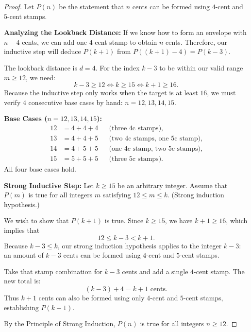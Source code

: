 \begin{proof}
Let $P(n)$ be the statement that $n$ cents can be formed using $4$-cent and $5$-cent stamps.

\textbf{Analyzing the Lookback Distance:}
If we know how to form an envelope with $n - 4$ cents, we can add one $4$-cent stamp to obtain $n$ cents. Therefore, our inductive step will deduce $P(k+1)$ from $P((k+1) - 4) = P(k-3)$.

The lookback distance is $d = 4$. For the index $k-3$ to be within our valid range $m \ge 12$, we need:
\[
k - 3 \ge 12 \iff k \ge 15 \iff k+1 \ge 16.
\]
Because the inductive step only works when the target is at least $16$, we must verify $4$ consecutive base cases by hand: $n = 12, 13, 14, 15$.

\textbf{Base Cases ($n = 12, 13, 14, 15$):}
\begin{align*}
12 &= 4 + 4 + 4 && \text{(three 4c stamps)},\\
13 &= 4 + 4 + 5 && \text{(two 4c stamps, one 5c stamp)},\\
14 &= 4 + 5 + 5 && \text{(one 4c stamp, two 5c stamps)},\\
15 &= 5 + 5 + 5 && \text{(three 5c stamps)}.
\end{align*}
All four base cases hold.

\textbf{Strong Inductive Step:}
Let $k \ge 15$ be an arbitrary integer. 
Assume that $P(m)$ is true for all integers $m$ satisfying $12 \le m \le k$. (Strong induction hypothesis.)

We wish to show that $P(k+1)$ is true. 
Since $k \ge 15$, we have $k+1 \ge 16$, which implies that
\[
12 \le k - 3 < k+1.
\]
Because $k-3 \le k$, our strong induction hypothesis applies to the integer $k-3$: an amount of $k-3$ cents can be formed using $4$-cent and $5$-cent stamps.

Take that stamp combination for $k-3$ cents and add a single $4$-cent stamp. The new total is:
\[
(k - 3) + 4 = k + 1 \text{ cents}.
\]
Thus $k+1$ cents can also be formed using only $4$-cent and $5$-cent stamps, establishing $P(k+1)$.

By the Principle of Strong Induction, $P(n)$ is true for all integers $n \ge 12$.
\end{proof}

